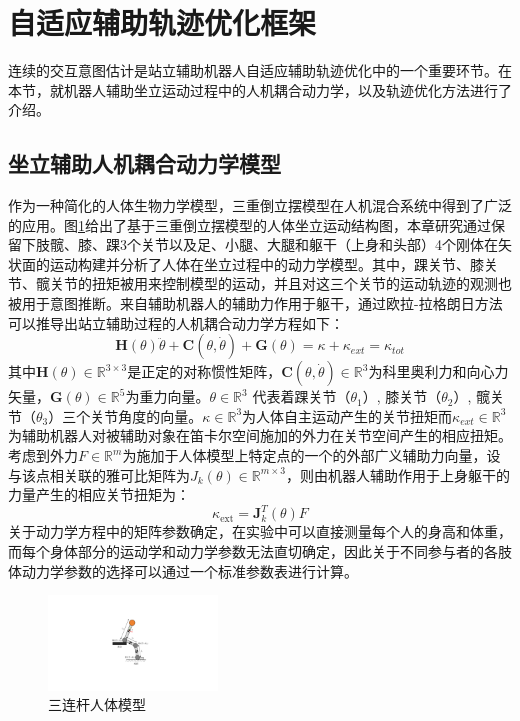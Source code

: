 \section{自适应辅助轨迹优化框架}  
连续的交互意图估计是站立辅助机器人自适应辅助轨迹优化中的一个重要环节。在本节，就机器人辅助坐立运动过程中的人机耦合动力学，以及轨迹优化方法进行了介绍。
\subsection{坐立辅助人机耦合动力学模型}  
作为一种简化的人体生物力学模型，三重倒立摆模型在人机混合系统中得到了广泛的应用。图\ref{fig:4-1}给出了基于三重倒立摆模型的人体坐立运动结构图，本章研究通过保留下肢髋、膝、踝3个关节以及足、小腿、大腿和躯干（上身和头部）4个刚体在矢状面的运动构建并分析了人体在坐立过程中的动力学模型。其中，踝关节、膝关节、髋关节的扭矩被用来控制模型的运动，并且对这三个关节的运动轨迹的观测也被用于意图推断。来自辅助机器人的辅助力作用于躯干，通过欧拉-拉格朗日方法可以推导出站立辅助过程的人机耦合动力学方程如下：
\begin{equation}
    \mathbf{H}(\theta) \ddot{\theta}+\mathbf{C}(\theta, \dot{\theta})+\mathbf{G}(\theta)=\kappa +\kappa_{ext}=\kappa_{tot}
    \label{eq:4-1}
\end{equation}
其中$\mathbf{H}(\theta)\in \mathbb{R}^{3\times 3}$是正定的对称惯性矩阵，$\mathbf{C}(\theta, \dot{\theta})\in \mathbb{R}^3$为科里奥利力和向心力矢量，$\mathbf{G}(\theta)\in \mathbb{R}^5$为重力向量。$\theta \in \mathbb{R}^3$ 代表着踝关节（$\theta_1$）, 膝关节（$\theta_2$）, 髋关节（$\theta_3$）三个关节角度的向量。$\kappa \in \mathbb{R}^3$为人体自主运动产生的关节扭矩而$\kappa_{ext} \in \mathbb{R}^3$为辅助机器人对被辅助对象在笛卡尔空间施加的外力在关节空间产生的相应扭矩。考虑到外力$F\in \mathbb{R}^m$为施加于人体模型上特定点的一个的外部广义辅助力向量，设与该点相关联的雅可比矩阵为$J_k(\theta)\in \mathbb{R}^{m\times 3}$，则由机器人辅助作用于上身躯干的力量产生的相应关节扭矩为：
\begin{equation}
    \kappa_{\text {ext}}=\mathbf{J}_k^T(\theta) F
    \label{eq:4-2}
\end{equation}
关于动力学方程中的矩阵参数确定，在实验中可以直接测量每个人的身高和体重，而每个身体部分的运动学和动力学参数无法直切确定，因此关于不同参与者的各肢体动力学参数的选择可以通过一个标准参数表进行计算\cite{tozerenHumanBodyDynamics2000}。

\begin{figure}[htb]
    \centering\includegraphics[width=0.4\textwidth]{figures/4-Fig-1.pdf}
    \caption{三连杆人体模型}
    \label{fig:4-1}
\end{figure}
